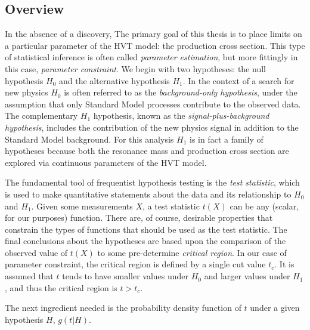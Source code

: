 \subsection{Overview}
In the absence of a discovery, The primary goal of this thesis is to place limits on a particular parameter of the HVT model: the production cross section.
This type of statistical inference is often called \textit{parameter estimation}, but more fittingly in this case, \textit{parameter constraint}. 
We begin with two hypotheses: the null hypothesis $H_0$ and the alternative hypothesis $H_1$.
In the context of a search for new physics $H_0$ is often referred to as the \textit{background-only hypothesis}, under the assumption that only Standard Model processes contribute to the observed data.
The complementary $H_1$ hypothesis, known as the \textit{signal-plus-background hypothesis}, includes the contribution of the new physics signal in addition to the Standard Model background.
For this analysis $H_1$ is in fact a family of hypotheses because both the resonance mass and production cross section are explored via continuous parameters of the HVT model.

The fundamental tool of frequentist hypothesis testing is the \textit{test statistic}, which is used to make quantitative statements about the data and its relationship to $H_0$ and $H_1$.
Given some measurements $X$, a test statistic $t(X)$ can be any (scalar, for our purposes) function.
There are, of course, desirable properties that constrain the types of functions that should be used as the test statistic.
The final conclusions about the hypotheses are based upon the comparison of the observed value of $t(X)$ to some pre-determine \textit{critical region}.
In our case of parameter constraint, the critical region is defined by a single cut value $t_c$.
It is assumed that $t$ tends to have smaller values under $H_0$ and larger values under $H_1$, and thus the critical region is $t > t_c$.

The next ingredient needed is the probability density function of $t$ under a given hypothesis $H$, $g(t|H)$.

